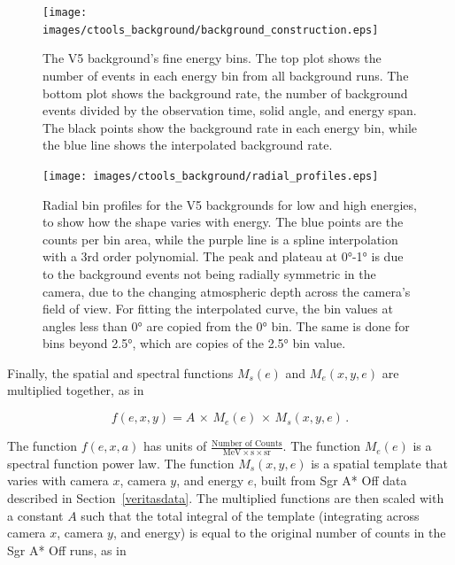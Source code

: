     \begin{figure}[p]
      \centering
      \texttt{[image: images/ctools\_background/background\_construction.eps]}
      \caption[Background Template with Fine Energy Bins]{
        The V5 background's fine energy bins.
        The top plot shows the number of events in each energy bin from all background runs.
        The bottom plot shows the background rate, the number of background events divided by the observation time, solid angle, and energy span.
        The black points show the background rate in each energy bin, while the blue line shows the interpolated background rate.
      }
      \label{fig:background_profile}
    \end{figure}

    \begin{figure}[hb]
      \centering
      \texttt{[image: images/ctools\_background/radial\_profiles.eps]}
      \caption[Radial Profiles of a Background Template]{
        Radial bin profiles for the V5 backgrounds for low and high energies, to show how the shape varies with energy.
        The blue points are the counts per bin area, while the purple line is a spline interpolation with a 3rd order polynomial.
        The peak and plateau at \ang{0}-\ang{1} is due to the background events not being radially symmetric in the camera, due to the changing atmospheric depth across the camera's field of view.
        For fitting the interpolated curve, the bin values at angles less than \ang{0} are copied from the \ang{0} bin.
        The same is done for bins beyond \ang{2.5}, which are copies of the \ang{2.5} bin value.
        }
      \label{fig:background_radial}
    \end{figure}
    
    Finally, the spatial and spectral functions $M_{s} \left ( e \right )$ and $M_e \left(x,y,e \right )$ are multiplied together, as in
    
    \begin{equation}\label{eqn:bck_template}
      f(e,x,y) = A \, \times \, M_{e} \left ( e \right ) \, \times \, M_{s} \left ( x, y, e \right ) \,.
    \end{equation} 
    
    The function $f(e,x,a)$ has units of $\frac{\textrm{Number of Counts}}{ \textrm{MeV} \times \textrm{s} \times \textrm{sr} }$.
    The function $M_{e}(e)$ is a spectral function power law.
    The function $M_{s}(x,y,e)$ is a spatial template that varies with camera $x$, camera $y$, and energy $e$, built from Sgr A* Off data described in Section~\ref{veritasdata}.
    The multiplied functions are then scaled with a constant $A$ such that the total integral of the template (integrating across camera $x$, camera $y$, and energy) is equal to the original number of counts in the Sgr A* Off runs, as in
    
